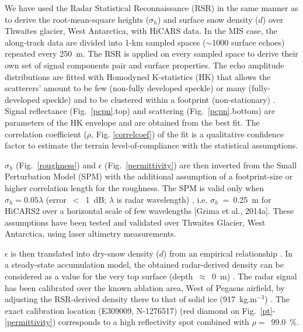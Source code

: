\documentclass[agums,grl]{agutexSI}
\begin{document}
\begin{article}
We have used the Radar Statistical Reconnaissance (RSR) in the same manner as \citet{Grima-2014-ID865,Grima-2014-ID867} to derive the root-mean-square heights ($\sigma_h$) and surface snow density ($d$) over Thwaites glacier, West Antarctica, with HiCARS data. In the MIS case, the along-track data are divided into 1-km sampled spaces ($\sim$1000 surface echoes) repeated every 250~m. The RSR is applied on every sampled space to derive their own set of signal components pair and surface properties.
The echo amplitude distributions are fitted with Homodyned K-statistics (HK) that allows the scatterers' amount to be few (non-fully developed speckle) or many (fully-developed speckle) and to be clustered within a footprint (non-stationary) \citep{Jakeman-1980-ID344,Jakeman-1987-ID343}. Signal reflectance (Fig.~\ref{pcpn}.top) and scattering (Fig.~\ref{pcpn}.bottom) are parameters of the HK envelope and are obtained from the best fit. The correlation coefficient ($\rho$, Fig. \ref{correlcoef}) of the fit is a qualitative conﬁdence factor to estimate the terrain level-of-compliance with the statistical assumptions.
\par
$\sigma_h$ (Fig.~\ref{roughness}) and $\epsilon$ (Fig.~\ref{permittivity}) are then inverted from the Small Perturbation Model (SPM) \citep[e.g.][]{Ulaby-1981-ID816,Ogilvy-1991-ID817} with the additional assumption of a footprint-size or higher correlation length for the roughness. The SPM is valid only when $\sigma_h = 0.05 \lambda$ (error~$<$~1~dB; $\lambda$ is radar wavelength) \citep{Thorsos-1989-ID713}, i.e. $\sigma_h$~=~0.25~m for HiCARS2 over a horizontal scale of few wavelengths [Grima et al., 2014a]. These assumptions have been tested and validated over Thwaites Glacier, West Antarctica, using laser altimetry measurements.
\par
$\epsilon$ is then translated into dry-snow density ($d$) from an empirical relationship \citep{Kovacs-1995-ID697,Frolov-1999-ID216}. In a steady-state accumulation model, the obtained radar-derived density can be considered as a value for the very top surface (depth~$\approx$~0~m) \citep{Grima-2014-ID867}. The radar signal has been calibrated over the known ablation area, West of Pegasus airfield, by adjusting the RSR-derived density there to that of solid ice (917~kg.m$^{-3}$) \citep{Frolov-1999-ID216}. The exact calibration location (E309009, N-1276517) (red diamond on Fig.~\ref{pt}-\ref{permittivity}) corresponds to a high reflectivity spot combined with $\rho=$~99.0~\%.

\end{article}
\end{document}
